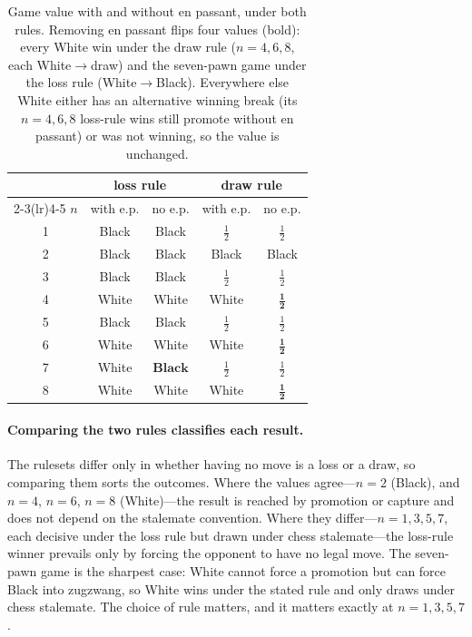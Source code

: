 \documentclass[11pt]{article}
\theoremstyle{plain}
\theoremstyle{definition}
\newcommand{\noepEightDraw}{$\mathbf{\tfrac12}$}
\begin{document}
\begin{table}[t]
\centering
\begin{tabular}{c cc cc}
\toprule
 & \multicolumn{2}{c}{loss rule} & \multicolumn{2}{c}{draw rule} \\
\cmidrule(lr){2-3}\cmidrule(lr){4-5}
$n$ & with e.p. & no e.p. & with e.p. & no e.p. \\
\midrule
1 & Black & Black & $\tfrac12$ & $\tfrac12$ \\
2 & Black & Black & Black & Black \\
3 & Black & Black & $\tfrac12$ & $\tfrac12$ \\
4 & White & White & White & $\mathbf{\tfrac12}$ \\
5 & Black & Black & $\tfrac12$ & $\tfrac12$ \\
6 & White & White & White & $\mathbf{\tfrac12}$ \\
7 & White & $\mathbf{Black}$ & $\tfrac12$ & $\tfrac12$ \\
8 & White & White & White & \noepEightDraw \\
\bottomrule
\end{tabular}
\caption{Game value with and without en passant, under both rules. Removing en
passant flips four values (bold): every White win under the draw rule ($n=4,6,8$,
each White$\rightarrow$draw) and the seven-pawn game under the loss rule
(White$\rightarrow$Black). Everywhere else White either has an alternative winning
break (its $n=4,6,8$ loss-rule wins still promote without en passant) or was not
winning, so the value is unchanged.}
\label{tab:noep}
\end{table}

\paragraph{Comparing the two rules classifies each result.} The rulesets differ
only in whether having no move is a loss or a draw, so comparing them sorts the
outcomes. Where the values agree---$n=2$ (Black), and $n=4$, $n=6$, $n=8$
(White)---the result is reached by promotion or capture and does not depend on the
stalemate convention. Where they differ---$n=1,3,5,7$, each decisive under the loss
rule but drawn under chess stalemate---the loss-rule winner prevails only by forcing
the opponent to have no legal move. The seven-pawn game is the sharpest case: White
cannot force a promotion but can force Black into zugzwang, so White wins under
the stated rule and only draws under chess stalemate. The choice of rule matters,
and it matters exactly at $n=1,3,5,7$.
\end{document}
